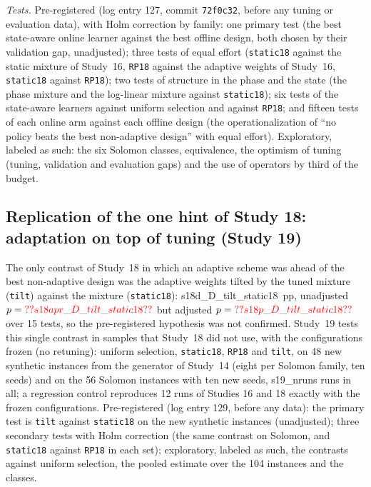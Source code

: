 \emph{Tests.} Pre-registered (log entry 127, commit \texttt{72f0c32}, before any tuning or evaluation data), with Holm correction by family: one primary test (the best state-aware online learner against the best offline design, both chosen by their validation gap, unadjusted); three tests of equal effort (\texttt{static18} against the static mixture of Study~16, \texttt{RP18} against the adaptive weights of Study~16, \texttt{static18} against \texttt{RP18}); two tests of structure in the phase and the state (the phase mixture and the log-linear mixture against \texttt{static18}); six tests of the state-aware learners against uniform selection and against \texttt{RP18}; and fifteen tests of each online arm against each offline design (the operationalization of ``no policy beats the best non-adaptive design'' with equal effort). Exploratory, labeled as such: the six Solomon classes, equivalence, the optimism of tuning (tuning, validation and evaluation gaps) and the use of operators by third of the budget.

\subsection{Replication of the one hint of Study 18: adaptation on top of tuning (Study 19)}\label{sec:s19design}
The only contrast of Study~18 in which an adaptive scheme was ahead of the best non-adaptive design was the adaptive weights tilted by the tuned mixture (\texttt{tilt}) against the mixture (\texttt{static18}): \num{s18d_D_tilt_static18}~pp, unadjusted $p=\num{s18apr_D_tilt_static18}$ but adjusted $p=\num{s18p_D_tilt_static18}$ over 15 tests, so the pre-registered hypothesis was not confirmed. Study~19 tests this single contrast in samples that Study~18 did not use, with the configurations frozen (no retuning): uniform selection, \texttt{static18}, \texttt{RP18} and \texttt{tilt}, on 48 new synthetic instances from the generator of Study~14 (eight per Solomon family, ten seeds) and on the 56 Solomon instances with ten new seeds, \num{s19_nruns} runs in all; a regression control reproduces 12 runs of Studies 16 and 18 exactly with the frozen configurations. Pre-registered (log entry 129, before any data): the primary test is \texttt{tilt} against \texttt{static18} on the new synthetic instances (unadjusted); three secondary tests with Holm correction (the same contrast on Solomon, and \texttt{static18} against \texttt{RP18} in each set); exploratory, labeled as such, the contrasts against uniform selection, the pooled estimate over the 104 instances and the classes.

